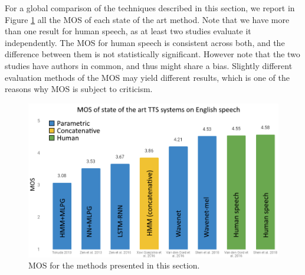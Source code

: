 \documentclass[a4paper, oneside, 12pt, english]{article}
\begin{document}
For a global comparison of the techniques described in this section, we report in Figure \ref{mos_all} all the MOS of each state of the art method. Note that we have more than one result for human speech, as at least two studies evaluate it independently. The MOS for human speech is consistent across both, and the difference between them is not statistically significant. However note that the two studies have authors in common, and thus might share a bias. Slightly different evaluation methods of the MOS may yield different results, which is one of the reasons why MOS is subject to criticism.

\begin{figure}[h]
	\centering
	\includegraphics[width=0.8\linewidth]{images/mos_all.png}
	\caption{MOS for the methods presented in this section.}
	\label{mos_all}
\end{figure}


\end{document}
